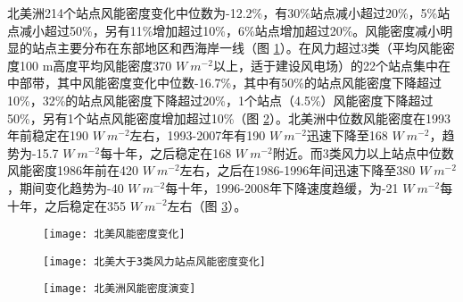 北美洲214个站点风能密度变化中位数为-12.2\%，有30\%站点减小超过20\%，5\%站点减小超过50\%，另有11\%增加超过10\%，6\%站点增加超过20\%。风能密度减小明显的站点主要分布在东部地区和西海岸一线（图 \ref{fig:NAwindpowerchange}）。在风力超过3类（平均风能密度100 m高度平均风能密度370 $W ~ m^{-2}$以上，适于建设风电场）的22个站点集中在中部带，其中风能密度变化中位数-16.7\%，其中有50\%的站点风能密度下降超过10\%，32\%的站点风能密度下降超过20\%，1个站点（4.5\%）风能密度下降超过50\%，另有1个站点风能密度增加超过10\%（图 \ref{fig:NAwindpowerchangeover3}）。北美洲中位数风能密度在1993年前稳定在190 $W ~ m^{-2}$左右，1993-2007年有190 $W ~ m^{-2}$迅速下降至168 $W ~ m^{-2}$，趋势为-15.7 $W ~ m^{-2}$每十年，之后稳定在168 $W ~ m^{-2}$附近。而3类风力以上站点中位数风能密度1986年前在420 $W ~ m^{-2}$左右，之后在1986-1996年间迅速下降至380 $W ~ m^{-2}$，期间变化趋势为-40 $W ~ m^{-2}$每十年，1996-2008年下降速度趋缓，为-21 $W ~ m^{-2}$每十年，之后稳定在355 $W ~ m^{-2}$左右（图 \ref{fig:NAwindpowerevolution}）。

\begin{figure}[!htbp]
    \centering
     \texttt{[image: 北美风能密度变化]}
    \label{fig:NAwindpowerchange}
\end{figure}

\begin{figure}[!htbp]
    \centering
     \texttt{[image: 北美大于3类风力站点风能密度变化]}
    \label{fig:NAwindpowerchangeover3}
\end{figure}

\begin{figure}[!htbp]
    \centering
     \texttt{[image: 北美洲风能密度演变]}
    \label{fig:NAwindpowerevolution}
\end{figure}

